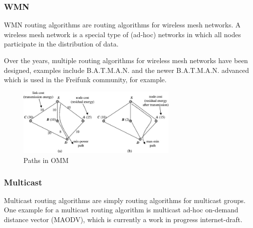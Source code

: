 \subsubsection*{WMN}
WMN routing algorithms are routing algorithms for wireless mesh networks.
A wireless mesh network is a special type of (ad-hoc) networks in which all
nodes participate in the distribution of data.

Over the years, multiple routing algorithms for wireless mesh networks have
been designed, examples include B.A.T.M.A.N. and the newer B.A.T.M.A.N. advanced
which is used in the Freifunk community, for example\cite{batman-adv}.
\begin{figure}
\centering
\includegraphics[width=0.7\textwidth]{images/omm}
\caption{Paths in OMM\cite{alotaibi2012survey}}
\label{ommex}
\end{figure}
\subsubsection*{Multicast}
Multicast routing algorithms are simply routing algorithms for multicast
groups.
One example for a multicast routing algorithm is multicast ad-hoc on-demand
distance vector (MAODV)\cite{manet-maodv-00}, which is currently a work
in progress internet-draft.
